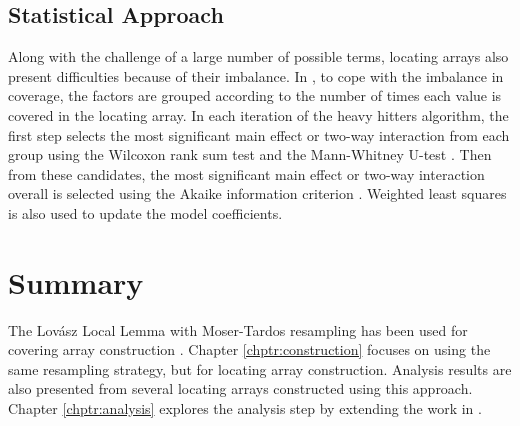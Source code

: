 \subsection{Statistical Approach} \label{sect:rel_stat_analysis}

Along with the challenge of a large number of possible terms, locating arrays also present difficulties because of their imbalance.
In \cite{AldacoCS15}, to cope with the imbalance in coverage, the factors are grouped according to the number of times each value is covered in the locating array.
In each iteration of the heavy hitters algorithm, the first step selects the most significant main effect or two-way interaction from each group using the Wilcoxon rank sum test and the Mann-Whitney U-test \cite{Fay2010, Mann1947, Wilcoxon1945}.
Then from these candidates, the most significant main effect or two-way interaction overall is selected using the Akaike information criterion \cite{Akaike1974}.
Weighted least squares is also used to update the model coefficients.

\section{Summary}

The Lov{\'a}sz Local Lemma with Moser-Tardos resampling has been used for covering array construction \cite{Sarkar}.
Chapter \ref{chptr:construction} focuses on using the same resampling strategy, but for locating array construction.
Analysis results are also presented from several locating arrays constructed using this approach.
Chapter \ref{chptr:analysis} explores the analysis step by extending the work in \cite{AldacoCS15,Compton-et-al-LA}.
